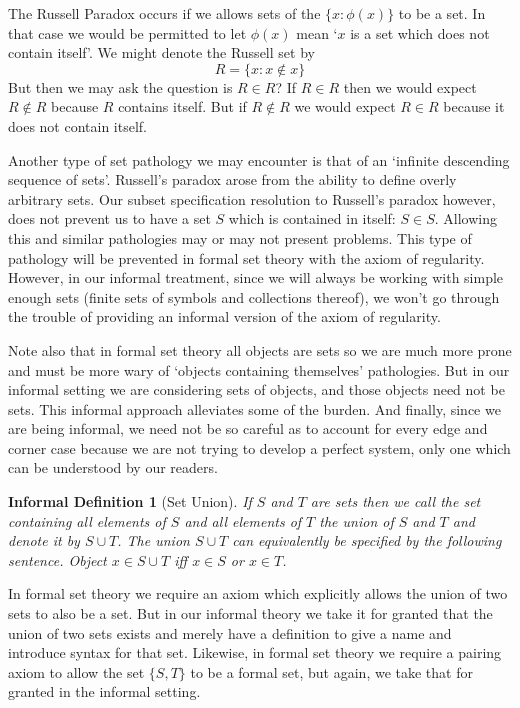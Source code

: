 \documentclass[12pt]{article}
\theoremstyle{break}
\theoremstyle{break}
\theoremstyle{break}
\theoremstyle{break}
\theoremstyle{break}
\newtheorem{informal definition}[definition]{Informal Definition}
\begin{document}
The Russell Paradox occurs if we allows sets of the $\{x:\phi(x)\}$ to be a set.
In that case we would be permitted to let $\phi(x)$ mean `$x$ is a set which does not contain itself'.
We might denote the Russell set by
$$
R = \{x: x \not \in x\}
$$
But then we may ask the question is $R\in R$?
If $R\in R$ then we would expect $R\not \in R$ because $R$ contains itself.
But if $R\not \in R$ we would expect $R\in R$ because it does not contain itself.

Another type of set pathology we may encounter is that of an `infinite descending sequence of sets'.
Russell's paradox arose from the ability to define overly arbitrary sets.
Our subset specification resolution to Russell's paradox however, does not prevent us to have a set $S$ which is  contained in itself: $S\in S$.
Allowing this and similar pathologies may or may not present problems.
This type of pathology will be prevented in formal set theory with the axiom of regularity.
However, in our informal treatment, since we will always be working with simple enough sets (finite sets of symbols and collections thereof), we won't go through the trouble of providing an informal version of the axiom of regularity.

Note also that in formal set theory all objects are sets so we are much more prone and must be more wary of `objects containing themselves' pathologies.
But in our informal setting we are considering sets of objects, and those objects need not be sets.
This informal approach alleviates some of the burden.
And finally, since we are being informal, we need not be so careful as to account for every edge and corner case because we are not trying to develop a perfect system, only one which can be understood by our readers.

\begin{informal definition}[Set Union]
If $S$ and $T$ are sets then we call the set containing all elements of $S$ and all elements of $T$ the union of $S$ and $T$ and denote it by $S\cup T$.
The union $S\cup T$ can equivalently be specified by the following sentence.
Object $x\in S\cup T$ iff $x \in S$ or $x\in T$.
\end{informal definition}
In formal set theory we require an axiom which explicitly allows the union of two sets to also be a set.
But in our informal theory we take it for granted that the union of two sets exists and merely have a definition to give a name and introduce syntax for that set.
Likewise, in formal set theory we require a pairing axiom to allow the set $\{S, T\}$ to be a formal set, but again, we take that for granted in the informal setting.
\end{document}
